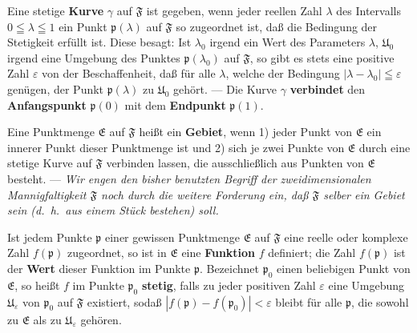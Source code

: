 \documentclass{article}
\begin{document}
Eine stetige \textbf{Kurve} $\gamma$ auf $\mathfrak{F}$ ist gegeben, wenn jeder reellen Zahl $\lambda$ des Intervalls $0 \leqq \lambda \leqq 1$ ein Punkt $\mathfrak{p}(\lambda)$ auf $\mathfrak{F}$ so zugeordnet ist, daß die Bedingung der Stetigkeit erfüllt ist. Diese besagt: Ist $\lambda_0$ irgend ein Wert des Parameters $\lambda$, $\mathfrak{U}_0$ irgend eine Umgebung des Punktes $\mathfrak{p}(\lambda_0)$ auf $\mathfrak{F}$, so gibt es stets eine positive Zahl $\varepsilon$ von der Beschaffenheit, daß für alle $\lambda$, welche der Bedingung $|\lambda - \lambda_0| \leqq \varepsilon$ genügen, der Punkt $\mathfrak{p}(\lambda)$ zu $\mathfrak{U}_0$ gehört. --- Die Kurve $\gamma$ \textbf{verbindet} den \textbf{Anfangspunkt} $\mathfrak{p}(0)$ mit dem \textbf{Endpunkt} $\mathfrak{p}(1)$.

Eine Punktmenge $\mathfrak{E}$ auf $\mathfrak{F}$ heißt ein \textbf{Gebiet}, wenn 1) jeder Punkt von $\mathfrak{E}$ ein innerer Punkt dieser Punktmenge ist und 2) sich je zwei Punkte von $\mathfrak{E}$ durch eine stetige Kurve auf $\mathfrak{F}$ verbinden lassen, die ausschließlich aus Punkten von $\mathfrak{E}$ besteht. --- \emph{Wir engen den bisher benutzten Begriff der zweidimensionalen Mannigfaltigkeit $\mathfrak{F}$ noch durch die weitere Forderung ein, daß $\mathfrak{F}$ selber ein Gebiet sein (d.\ h.\ aus einem Stück bestehen) soll.}

Ist jedem Punkte $\mathfrak{p}$ einer gewissen Punktmenge $\mathfrak{E}$ auf $\mathfrak{F}$ eine reelle oder komplexe Zahl $f(\mathfrak{p})$ zugeordnet, so ist in $\mathfrak{E}$ eine \textbf{Funktion} $f$ definiert; die Zahl $f(\mathfrak{p})$ ist der \textbf{Wert} dieser Funktion im Punkte $\mathfrak{p}$. Bezeichnet $\mathfrak{p}_0$ einen beliebigen Punkt von $\mathfrak{E}$, so heißt $f$ im Punkte $\mathfrak{p}_0$ \textbf{stetig}, falls zu jeder positiven Zahl $\varepsilon$ eine Umgebung $\mathfrak{U}_\varepsilon$ von $\mathfrak{p}_0$ auf $\mathfrak{F}$ existiert, sodaß $|f(\mathfrak{p}) - f(\mathfrak{p}_0)| < \varepsilon$ bleibt für alle $\mathfrak{p}$, die sowohl zu $\mathfrak{E}$ als zu $\mathfrak{U}_\varepsilon$ gehören.
\end{document}
